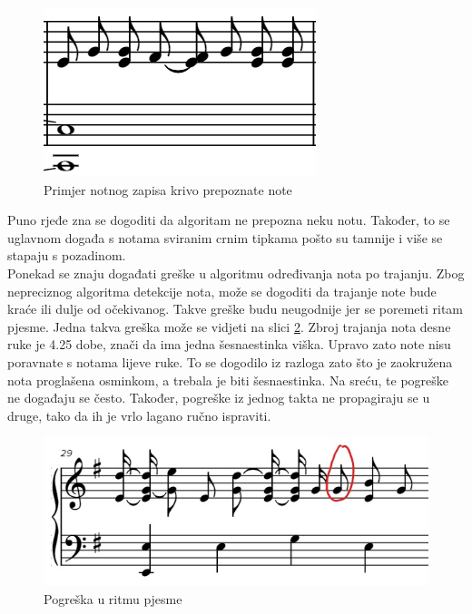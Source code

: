 \documentclass[times, utf8, zavrsni, numeric]{fer}
\begin{document}
\begin{figure}[h]
	\includegraphics[scale=1]{spojfnote.png}
	\centering
	\caption{Primjer notnog zapisa krivo prepoznate note}
	\label{fig:spojfnote}
\end{figure}

Puno rjeđe zna se dogoditi da algoritam ne prepozna neku notu. Također, to se uglavnom događa s notama sviranim crnim tipkama pošto su tamnije i više se stapaju s pozadinom.\\

Ponekad se znaju događati greške u algoritmu određivanja nota po trajanju. Zbog nepreciznog algoritma detekcije nota, može se dogoditi da trajanje note bude kraće ili dulje od očekivanog. Takve greške budu neugodnije jer se poremeti ritam pjesme. Jedna takva greška može se vidjeti na slici \ref{fig:ritamerror}. Zbroj trajanja nota desne ruke je 4.25 dobe, znači da ima jedna šesnaestinka viška. Upravo zato note nisu poravnate s notama lijeve ruke. To se dogodilo iz razloga zato što je zaokružena nota proglašena osminkom, a trebala je biti šesnaestinka. Na sreću, te pogreške ne događaju se često. Također, pogreške iz jednog takta ne propagiraju se u druge, tako da ih je vrlo lagano ručno ispraviti.\\

\begin{figure}[h]
	\includegraphics[scale=0.7]{ritamerror.jpg}
	\centering
	\caption{Pogreška u ritmu pjesme}
	\label{fig:ritamerror}
\end{figure}
\end{document}
